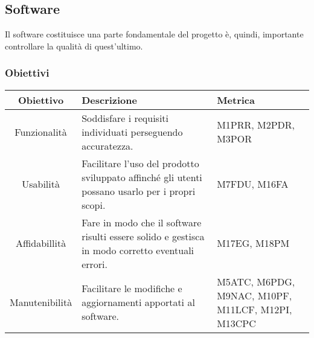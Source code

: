 \subsection{Software}
Il software costituisce una parte fondamentale del progetto è, quindi, importante controllare la qualità di quest'ultimo.

\subsubsection{Obiettivi}
\begin{center}
	\renewcommand{\arraystretch}{1.8}
	\begin{tabular}{ |c|m{18em}|m{8em}|}
		\hline
		\textbf{Obiettivo} & \textbf{Descrizione} & \textbf{Metrica} \\
		\hline
		Funzionalità & Soddisfare i requisiti individuati perseguendo accuratezza. & M1PRR, M2PDR, M3POR \\
		\hline
		Usabilità & Facilitare l'uso del prodotto sviluppato affinché gli utenti possano usarlo per i propri scopi. & M7FDU, M16FA \\
    \hline
		Affidabillità & Fare in modo che il software risulti essere solido e gestisca in modo corretto eventuali errori. & M17EG, M18PM \\
		\hline
		Manutenibilità & Facilitare le modifiche e aggiornamenti apportati al software. & M5ATC, M6PDG, M9NAC, M10PF, M11LCF, M12PI, M13CPC \\
		\hline
	\end{tabular}
\end{center}

